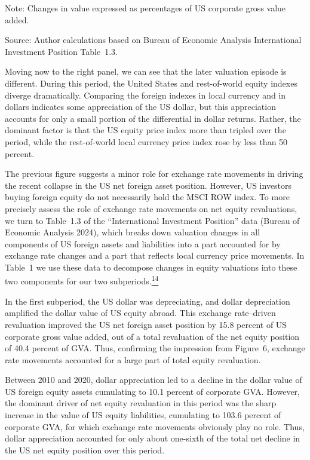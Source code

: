 \documentclass[11pt]{article}
\begin{document}
Note: Changes in value expressed as percentages of US corporate gross value added.


Source: Author calculations based on Bureau of Economic Analysis International Investment Position Table 1.3.


Moving now to the right panel, we can see that the later valuation episode is different. During this period, the United States and rest-of-world equity indexes diverge dramatically. Comparing the foreign indexes in local currency and in dollars indicates some appreciation of the US dollar, but this appreciation accounts for only a small portion of the differential in dollar returns. Rather, the dominant factor is that the US equity price index more than tripled over the period, while the rest-of-world local currency price index rose by less than 50 percent.


The previous figure suggests a minor role for exchange rate movements in driving the recent collapse in the US net foreign asset position. However, US investors buying foreign equity do not necessarily hold the MSCI ROW index. To more precisely assess the role of exchange rate movements on net equity revaluations, we turn to Table 1.3 of the “International Investment Position” data (Bureau of Economic Analysis 2024), which breaks down valuation changes in all components of US foreign assets and liabilities into a part accounted for by exchange rate changes and a part that reflects local currency price movements. In Table 1 we use these data to decompose changes in equity valuations into these two components for our two subperiods.\hyperlink{fn:14}{\textsuperscript{14}}


In the first subperiod, the US dollar was depreciating, and dollar depreciation amplified the dollar value of US equity abroad. This exchange rate–driven revaluation improved the US net foreign asset position by 15.8 percent of US corporate gross value added, out of a total revaluation of the net equity position of 40.4 percent of GVA. Thus, confirming the impression from Figure 6, exchange rate movements accounted for a large part of total equity revaluation.


Between 2010 and 2020, dollar appreciation led to a decline in the dollar value of US foreign equity assets cumulating to 10.1 percent of corporate GVA. However, the dominant driver of net equity revaluation in this period was the sharp increase in the value of US equity liabilities, cumulating to 103.6 percent of corporate GVA, for which exchange rate movements obviously play no role. Thus, dollar appreciation accounted for only about one-sixth of the total net decline in the US net equity position over this period.
\end{document}

